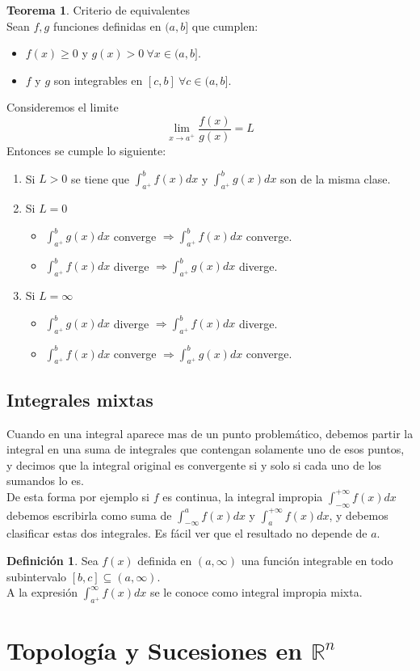 \documentclass[10pt]{article}
\theoremstyle{definition}
\newtheorem{definition}{Definición}[section]
\newtheorem{theorem}{Teorema}[section]
\begin{document}
\begin{theorem}{Criterio de equivalentes}
    \\Sean $f,g$ funciones definidas en $(a,b]$ que cumplen:
    \begin{itemize}
        \item $f(x)\ge 0$ y $g(x)>0\ \forall x\in (a,b]$.
        \item $f$ y $g$ son integrables en $[c,b]\ \forall c\in (a,b]$.
    \end{itemize}
    Consideremos el limite $$\lim_{x \to a^+} \frac{f(x)}{g(x)}=L$$
    Entonces se cumple lo siguiente:
    \begin{enumerate}
        \item Si $L>0$ se tiene que $\int_{a^+}^{b} f(x) dx$ y $\int_{a^+}^{b} g(x) dx$ son de la misma clase.
        \item Si $L=0$
            \begin{itemize}
                \item $\int_{a^+}^{b} g(x) dx$ converge $\Rightarrow \int_{a^+}^{b} f(x) dx$ converge.
                \item $\int_{a^+}^{b} f(x) dx$ diverge $\Rightarrow \int_{a^+}^{b} g(x) dx$ diverge.
            \end{itemize}
        \item Si $L=\infty$
            \begin{itemize}
                \item $\int_{a^+}^{b} g(x) dx$ diverge $\Rightarrow \int_{a^+}^{b} f(x) dx$ diverge.
                \item $\int_{a^+}^{b} f(x) dx$ converge $\Rightarrow \int_{a^+}^{b} g(x) dx$ converge.
            \end{itemize}
    \end{enumerate}
\end{theorem}
\subsection{Integrales mixtas}
Cuando en una integral aparece mas de un punto problemático, debemos partir la integral en una suma de integrales que contengan solamente uno de esos puntos, y decimos que la integral original es convergente si y solo si cada uno de los sumandos lo es.\\
De esta forma por ejemplo si $f$ es continua, la integral impropia $\int_{-\infty}^{+\infty} f(x) dx$ debemos escribirla como suma de $\int_{-\infty}^{a} f(x) dx$ y $\int_{a}^{+\infty} f(x) dx$, y debemos clasificar estas dos integrales. Es fácil ver que el resultado no depende de $a$.
\begin{definition}
    Sea $f(x)$ definida en $(a,\infty)$ una función integrable en todo subintervalo $[b,c]\subseteq (a,\infty)$.
    \\A la expresión $\int_{a^+}^{\infty} f(x) dx$ se le conoce como integral impropia mixta.
\end{definition}
\newpage\section{Topología y Sucesiones en $\mathbb{R}^n$}
\end{document}
